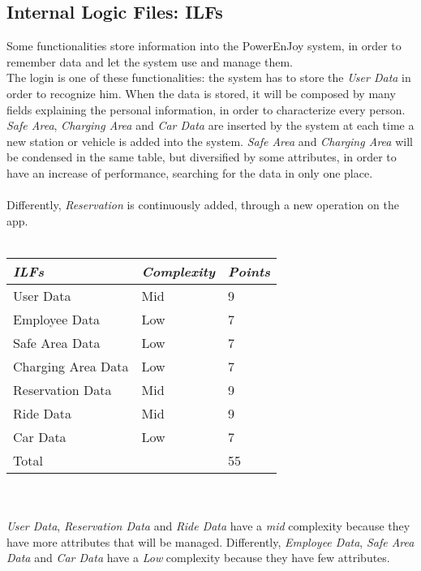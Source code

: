\documentclass[11pt,a4paper]{report}
\begin{document}
\subsection{Internal Logic Files: ILFs}
Some functionalities store information into the PowerEnJoy system, in order to remember data and let the system use and manage them.\\
The login is one of these functionalities: the system has to store the \textit{User Data} in order to recognize him. When the data is stored, it will be composed by many fields explaining the personal information, in order to characterize every person.\\
\textit{Safe Area}, \textit{Charging Area} and \textit{Car Data} are inserted by the system at each time a new station or vehicle is added into the system. \textit{Safe Area} and \textit{Charging Area} will be condensed in the same table, but diversified by some attributes, in order to have an increase of performance, searching for the data in only one place. \\\\
Differently, \textit{Reservation} is continuously added, through a new operation on the app.
\\\\
\begin{tabularx}{\textwidth}{|X|X|X|}
	\hline
	\textit{ILFs} & \textit{Complexity} & \textit{Points}\\
	\hline
	User Data & Mid & 9\\
	Employee Data & Low & 7\\
	Safe Area Data & Low & 7\\
	Charging Area Data & Low & 7\\
	Reservation Data & Mid & 9\\
	Ride Data & Mid & 9\\
	Car Data & Low & 7\\
	\hline
	\hline
	Total & \multicolumn{1}{X}{} & \multicolumn{1}{X|}{55}\\
	\hline
\end{tabularx}
\\\\
\textit{User Data}, \textit{Reservation Data} and \textit{Ride Data} have a \textit{mid} complexity because they have more attributes that will be managed. Differently, \textit{Employee Data}, \textit{Safe Area Data} and \textit{Car Data} have a \textit{Low} complexity because they have few attributes.
\end{document}
